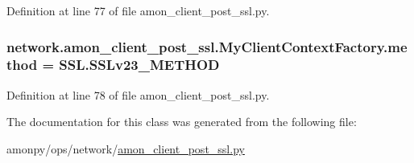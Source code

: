 Definition at line 77 of file amon\-\_\-client\-\_\-post\-\_\-ssl.\-py.

\hypertarget{classnetwork_1_1amon__client__post__ssl_1_1_my_client_context_factory_ae250225a1c80aaaa42e24ab2212695a2}{
\subsubsection[{method}]{\setlength{\rightskip}{0pt plus 5cm}network.\-amon\-\_\-client\-\_\-post\-\_\-ssl.\-My\-Client\-Context\-Factory.\-method = S\-S\-L.\-S\-S\-Lv23\-\_\-\-M\-E\-T\-H\-O\-D\hspace{0.3cm}{\ttfamily [static]}}}\label{classnetwork_1_1amon__client__post__ssl_1_1_my_client_context_factory_ae250225a1c80aaaa42e24ab2212695a2}


Definition at line 78 of file amon\-\_\-client\-\_\-post\-\_\-ssl.\-py.



The documentation for this class was generated from the following file\-:\begin{DoxyCompactItemize}
\item 
amonpy/ops/network/\hyperlink{amon__client__post__ssl_8py}{amon\-\_\-client\-\_\-post\-\_\-ssl.\-py}\end{DoxyCompactItemize}
